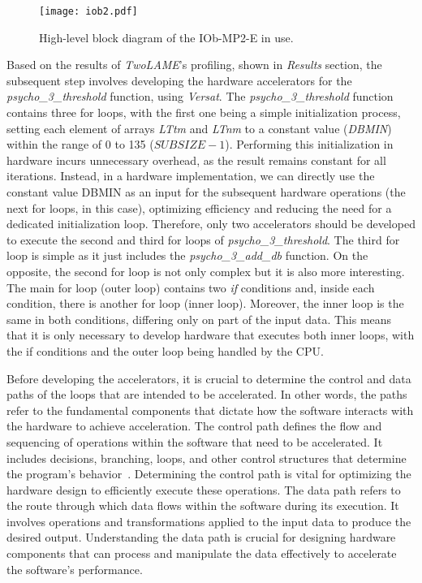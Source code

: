 \vspace{0.1cm}

\begin{figure}[H]
\centerline{\texttt{[image: iob2.pdf]}}
\caption{High-level block diagram of the IOb-MP2-E in use.}
\label{fig:newiob1}
\end{figure}

\vspace{0.1cm}

Based on the results of \textit{TwoLAME}'s profiling, shown in \textit{Results} section, the subsequent step involves developing the hardware accelerators for the \textit{psycho\_3\_threshold} function, using \textit{Versat}.
The \textit{psycho\_3\_threshold} function contains three for loops, with the first one being a simple initialization process, setting each element of arrays \textit{LTtm} and \textit{LTnm} to a constant value (\textit{DBMIN}) within the range of 0 to 135 ($SUBSIZE-1$). Performing this initialization in hardware incurs unnecessary overhead, as the result remains constant for all iterations. Instead, in a hardware implementation, we can directly use the constant value DBMIN as an input for the subsequent hardware operations (the next for loops, in this case), optimizing efficiency and reducing the need for a dedicated initialization loop.
Therefore, only two accelerators should be developed to execute the second and third for loops of \textit{psycho\_3\_threshold}.
The third for loop is simple as it just includes the \textit{psycho\_3\_add\_db} function. 
On the opposite, the second for loop is not only complex but it is also more interesting. The main for loop (outer loop) contains two \textit{if} conditions and, inside each condition, there is another for loop (inner loop). Moreover, the inner loop is the same in both conditions, differing only on part of the input data. This means that it is only necessary to develop hardware that executes both inner loops, with the if conditions and the outer loop being handled by the CPU.

Before developing the accelerators, it is crucial to determine the control and data paths of the loops that are intended to be accelerated. In other words, the paths refer to the fundamental components that dictate how the software interacts with the hardware to achieve acceleration.
The control path defines the flow and sequencing of operations within the software that need to be accelerated. It includes decisions, branching, loops, and other control structures that determine the program's behavior~\cite{datacontrolpath}. Determining the control path is vital for optimizing the hardware design to efficiently execute these operations.
The data path refers to the route through which data flows within the software during its execution. It involves operations and transformations applied to the input data to produce the desired output. Understanding the data path is crucial for designing hardware components that can process and manipulate the data effectively to accelerate the software's performance.

